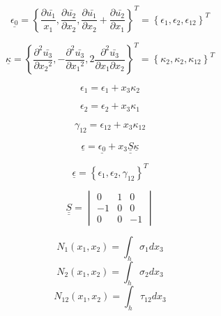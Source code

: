 		\begin{equation}\label{eq2.67}
			\underline{\epsilon_0}
			=
			\left\{ 
			  \frac{\partial{\bar{u_1}}}{x_1}, \frac{\partial{\bar{u_2}}}{\partial{x_2}}, \frac{\partial{\bar{u_1}}}{\partial{x_2}}
			  + \frac{\partial{\bar{u_2}}}{\partial{x_1}}
			\right\}^T
			=
			\left\{
			  \epsilon_1, \epsilon_2, \epsilon_{12}
			\right\}^T
		\end{equation}
		  
		\begin{equation}\label{eq2.68}
			\underline{\kappa}
			=
			\left\{
			  \frac{\partial^2 \bar{u_3}}{\partial{x_2}^2},
			  - \frac{\partial^2 \bar{u_3}}{\partial{x_1}^2},
			  2 \frac{\partial^2 \bar{u_3}}{\partial{x_1}\partial{x_2}}
			\right\}^T
			=
			\left\{ 
			  \kappa_2, \kappa_2, \kappa_{12}
			\right\}^T
		\end{equation}
		  
		\begin{equation}
		  \epsilon_1 = \epsilon_1 + x_3 \kappa_2
		\end{equation}

		\begin{equation}
		  \epsilon_2 = \epsilon_2 + x_3 \kappa_1
		\end{equation}

		\begin{equation}
		  \gamma_{12} = \epsilon_{12} + x_3 \kappa_{12}
		\end{equation}
		 
		\begin{equation}\label{eq:2.56}
			\underline{\epsilon} = \underline{\epsilon_0} + x_3 \underline{\underline{S}} \underline{\kappa}
		\end{equation}

		\begin{equation}\label{eq:2.57}
			\underline{\epsilon} = \left\{ \epsilon_1, \epsilon_2, \gamma_{12} \right\} ^T
		\end{equation}

		\begin{equation}
			\underline{\underline{S}}
			=
			\begin{vmatrix}
				0 & 1 & 0 \\
				-1 & 0 & 0 \\
				0 & 0 & -1
			\end{vmatrix}
		\end{equation}
		
		\begin{equation}
		  N_1(x_1,x_2) = \int_h \sigma_1 dx_3
		\end{equation}
		\begin{equation}
		  N_2(x_1,x_2) = \int_h \sigma_2 dx_3
		\end{equation}
		\begin{equation}
		  N_{12}(x_1,x_2) = \int_h \tau_{12} dx_3
		\end{equation}

